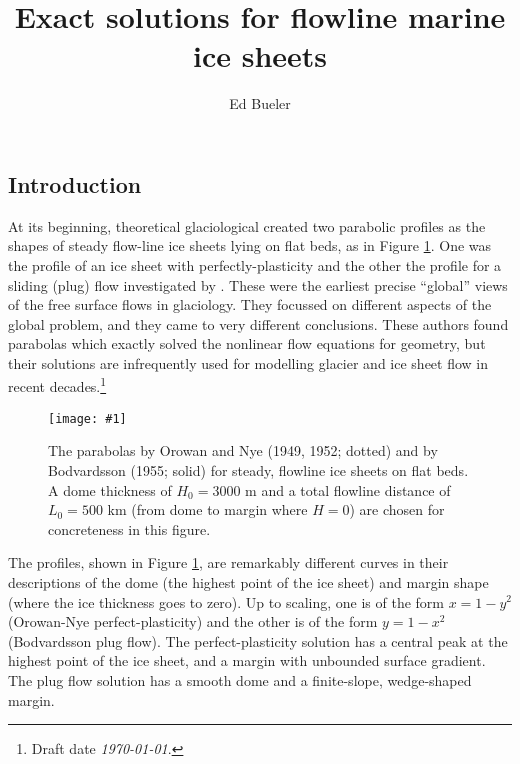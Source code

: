 \documentclass[twocolumn,letterpaper]{igs}
\newcommand{\onecol}[1]{\texttt{[image: \#1]}}
\begin{document}
\title{Exact solutions for flowline marine ice sheets}


\author{Ed Bueler}



\maketitle

\subsection*{Introduction}  At its beginning, theoretical glaciological created two parabolic profiles as the shapes of steady flow-line ice sheets lying on flat beds, as in Figure \ref{fig:twoparabolas}.  One was the profile of an ice sheet with perfectly-plasticity \citep{Orowan,Nye52plastic} and the other the profile for a sliding (plug) flow investigated by \cite{Bodvardsson}.  These were the earliest precise ``global'' views of the free surface flows in glaciology.  They focussed on different aspects of the global problem, and they came to very different conclusions.  These authors found parabolas which exactly solved the nonlinear flow equations for geometry, but their solutions are infrequently used for modelling glacier and ice sheet flow in recent decades.\footnote{Draft date \emph{\today}.}

\begin{figure}[ht]
\onecol{twoparabolas}
\caption{The parabolas by Orowan and Nye (1949, 1952; dotted) and by Bodvardsson (1955; solid) for steady, flowline ice sheets on flat beds.  A dome thickness of $H_0=3000$ m and a total flowline distance of $L_0=500$ km (from dome to margin where $H=0$) are chosen for concreteness in this figure.} \label{fig:twoparabolas}
\end{figure}

The profiles, shown in Figure \ref{fig:twoparabolas}, are remarkably different curves in their descriptions of the dome (the highest point of the ice sheet) and margin shape (where the ice thickness goes to zero).   Up to scaling, one is of the form $x=1-y^2$ (Orowan-Nye perfect-plasticity)\nocite{Nye52plastic,Orowan} and the other is of the form $y=1-x^2$ (Bodvardsson plug flow).  The perfect-plasticity solution has a central peak at the highest point of the ice sheet, and a margin with unbounded surface gradient.  The plug flow solution has a smooth dome and a finite-slope, wedge-shaped margin.
\end{document}
